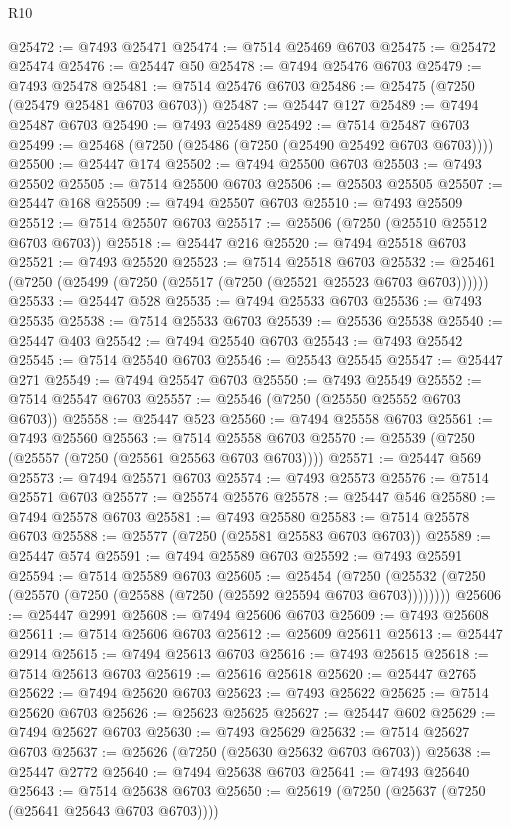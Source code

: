 \begin{lexlean}{R10}
\begin{coremodule}
@25472 := @7493 @25471
@25474 := @7514 @25469 @6703
@25475 := @25472 @25474
@25476 := @25447 @50
@25478 := @7494 @25476 @6703
@25479 := @7493 @25478
@25481 := @7514 @25476 @6703
@25486 := @25475 (@7250 (@25479 @25481 @6703 @6703))
@25487 := @25447 @127
@25489 := @7494 @25487 @6703
@25490 := @7493 @25489
@25492 := @7514 @25487 @6703
@25499 := @25468 (@7250 (@25486 (@7250 (@25490 @25492 @6703 @6703))))
@25500 := @25447 @174
@25502 := @7494 @25500 @6703
@25503 := @7493 @25502
@25505 := @7514 @25500 @6703
@25506 := @25503 @25505
@25507 := @25447 @168
@25509 := @7494 @25507 @6703
@25510 := @7493 @25509
@25512 := @7514 @25507 @6703
@25517 := @25506 (@7250 (@25510 @25512 @6703 @6703))
@25518 := @25447 @216
@25520 := @7494 @25518 @6703
@25521 := @7493 @25520
@25523 := @7514 @25518 @6703
@25532 := @25461 (@7250 (@25499 (@7250 (@25517 (@7250 (@25521 @25523 @6703 @6703))))))
@25533 := @25447 @528
@25535 := @7494 @25533 @6703
@25536 := @7493 @25535
@25538 := @7514 @25533 @6703
@25539 := @25536 @25538
@25540 := @25447 @403
@25542 := @7494 @25540 @6703
@25543 := @7493 @25542
@25545 := @7514 @25540 @6703
@25546 := @25543 @25545
@25547 := @25447 @271
@25549 := @7494 @25547 @6703
@25550 := @7493 @25549
@25552 := @7514 @25547 @6703
@25557 := @25546 (@7250 (@25550 @25552 @6703 @6703))
@25558 := @25447 @523
@25560 := @7494 @25558 @6703
@25561 := @7493 @25560
@25563 := @7514 @25558 @6703
@25570 := @25539 (@7250 (@25557 (@7250 (@25561 @25563 @6703 @6703))))
@25571 := @25447 @569
@25573 := @7494 @25571 @6703
@25574 := @7493 @25573
@25576 := @7514 @25571 @6703
@25577 := @25574 @25576
@25578 := @25447 @546
@25580 := @7494 @25578 @6703
@25581 := @7493 @25580
@25583 := @7514 @25578 @6703
@25588 := @25577 (@7250 (@25581 @25583 @6703 @6703))
@25589 := @25447 @574
@25591 := @7494 @25589 @6703
@25592 := @7493 @25591
@25594 := @7514 @25589 @6703
@25605 := @25454
    (@7250 (@25532 (@7250 (@25570 (@7250 (@25588 (@7250 (@25592 @25594 @6703 @6703))))))))
@25606 := @25447 @2991
@25608 := @7494 @25606 @6703
@25609 := @7493 @25608
@25611 := @7514 @25606 @6703
@25612 := @25609 @25611
@25613 := @25447 @2914
@25615 := @7494 @25613 @6703
@25616 := @7493 @25615
@25618 := @7514 @25613 @6703
@25619 := @25616 @25618
@25620 := @25447 @2765
@25622 := @7494 @25620 @6703
@25623 := @7493 @25622
@25625 := @7514 @25620 @6703
@25626 := @25623 @25625
@25627 := @25447 @602
@25629 := @7494 @25627 @6703
@25630 := @7493 @25629
@25632 := @7514 @25627 @6703
@25637 := @25626 (@7250 (@25630 @25632 @6703 @6703))
@25638 := @25447 @2772
@25640 := @7494 @25638 @6703
@25641 := @7493 @25640
@25643 := @7514 @25638 @6703
@25650 := @25619 (@7250 (@25637 (@7250 (@25641 @25643 @6703 @6703))))

\end{coremodule}
\end{lexlean}
